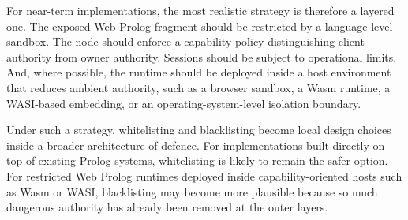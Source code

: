 For near-term implementations, the most realistic strategy is therefore a layered one. The exposed Web Prolog fragment should be restricted by a language-level sandbox. The node should enforce a capability policy distinguishing client authority from owner authority. Sessions should be subject to operational limits. And, where possible, the runtime should be deployed inside a host environment that reduces ambient authority, such as a browser sandbox, a Wasm runtime, a WASI-based embedding, or an operating-system-level isolation boundary.

Under such a strategy, whitelisting and blacklisting become local design choices inside a broader architecture of defence. For implementations built directly on top of existing Prolog systems, whitelisting is likely to remain the safer option. For restricted Web Prolog runtimes deployed inside capability-oriented hosts such as Wasm or WASI, blacklisting may become more plausible because so much dangerous authority has already been removed at the outer layers.


